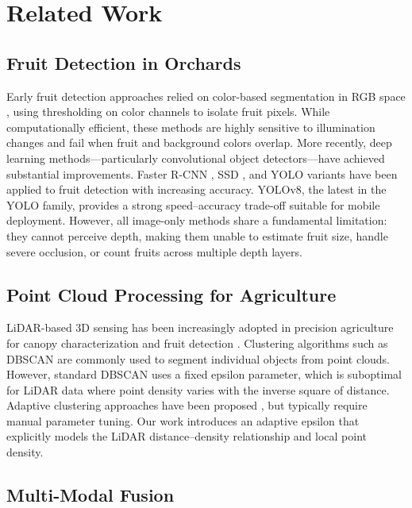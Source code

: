 \documentclass[article,final]{iclr2024_conference}
\begin{document}
\section{Related Work}
\label{sec:related}

\subsection{Fruit Detection in Orchards}

Early fruit detection approaches relied on color-based segmentation in RGB space \citep{ji2014apple}, using thresholding on color channels to isolate fruit pixels. While computationally efficient, these methods are highly sensitive to illumination changes and fail when fruit and background colors overlap. More recently, deep learning methods---particularly convolutional object detectors---have achieved substantial improvements. Faster R-CNN \citep{ren2015faster}, SSD \citep{liu2016ssd}, and YOLO variants \citep{redmon2016you, jocher2023yolov8} have been applied to fruit detection with increasing accuracy. YOLOv8, the latest in the YOLO family, provides a strong speed--accuracy trade-off suitable for mobile deployment. However, all image-only methods share a fundamental limitation: they cannot perceive depth, making them unable to estimate fruit size, handle severe occlusion, or count fruits across multiple depth layers.

\subsection{Point Cloud Processing for Agriculture}

LiDAR-based 3D sensing has been increasingly adopted in precision agriculture for canopy characterization \citep{sanchez2018lidar} and fruit detection \citep{nguyen20163d}. Clustering algorithms such as DBSCAN \citep{ester1996density} are commonly used to segment individual objects from point clouds. However, standard DBSCAN uses a fixed epsilon parameter, which is suboptimal for LiDAR data where point density varies with the inverse square of distance. Adaptive clustering approaches have been proposed \citep{bryson2015adaptive}, but typically require manual parameter tuning. Our work introduces an adaptive epsilon that explicitly models the LiDAR distance--density relationship and local point density.

\subsection{Multi-Modal Fusion}
\end{document}
